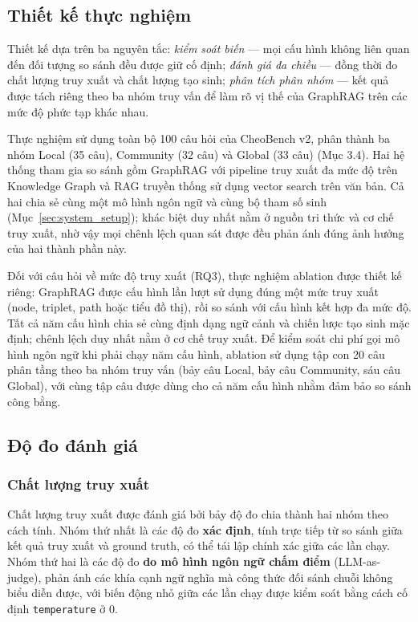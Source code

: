 \subsection{Thiết kế thực nghiệm}

Thiết kế dựa trên ba nguyên tắc: \textit{kiểm soát biến} --- mọi cấu hình không liên quan đến đối tượng so sánh đều được giữ cố định; \textit{đánh giá đa chiều} --- đồng thời đo chất lượng truy xuất và chất lượng tạo sinh; \textit{phân tích phân nhóm} --- kết quả được tách riêng theo ba nhóm truy vấn để làm rõ vị thế của GraphRAG trên các mức độ phức tạp khác nhau.

Thực nghiệm sử dụng toàn bộ 100 câu hỏi của CheoBench v2, phân thành ba nhóm Local (35 câu), Community (32 câu) và Global (33 câu) (Mục 3.4). Hai hệ thống tham gia so sánh gồm GraphRAG với pipeline truy xuất đa mức độ trên Knowledge Graph và RAG truyền thống sử dụng vector search trên văn bản. Cả hai chia sẻ cùng một mô hình ngôn ngữ và cùng bộ tham số sinh (Mục~\ref{sec:system_setup}); khác biệt duy nhất nằm ở nguồn tri thức và cơ chế truy xuất, nhờ vậy mọi chênh lệch quan sát được đều phản ánh đúng ảnh hưởng của hai thành phần này.

Đối với câu hỏi về mức độ truy xuất (RQ3), thực nghiệm ablation được thiết kế riêng: GraphRAG được cấu hình lần lượt sử dụng đúng một mức truy xuất (node, triplet, path hoặc tiểu đồ thị), rồi so sánh với cấu hình kết hợp đa mức độ. Tất cả năm cấu hình chia sẻ cùng định dạng ngữ cảnh và chiến lược tạo sinh mặc định; chênh lệch duy nhất nằm ở cơ chế truy xuất. Để kiểm soát chi phí gọi mô hình ngôn ngữ khi phải chạy năm cấu hình, ablation sử dụng tập con 20 câu phân tầng theo ba nhóm truy vấn (bảy câu Local, bảy câu Community, sáu câu Global), với cùng tập câu được dùng cho cả năm cấu hình nhằm đảm bảo so sánh công bằng.

\subsection{Độ đo đánh giá}
\label{sec:metrics}

\subsubsection{Chất lượng truy xuất}

Chất lượng truy xuất được đánh giá bởi bảy độ đo chia thành hai nhóm theo cách tính. Nhóm thứ nhất là các độ đo \textbf{xác định}, tính trực tiếp từ so sánh giữa kết quả truy xuất và ground truth, có thể tái lập chính xác giữa các lần chạy. Nhóm thứ hai là các độ đo \textbf{do mô hình ngôn ngữ chấm điểm} (LLM-as-judge), phản ánh các khía cạnh ngữ nghĩa mà công thức đối sánh chuỗi không biểu diễn được, với biến động nhỏ giữa các lần chạy được kiểm soát bằng cách cố định \texttt{temperature} ở 0.


